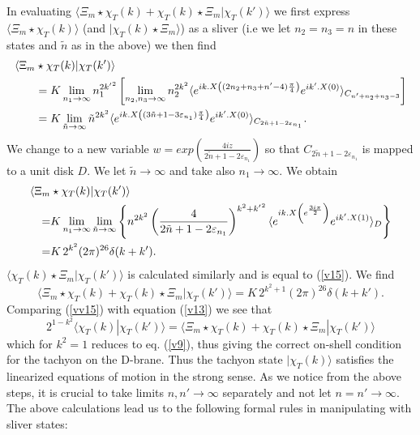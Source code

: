 \documentclass[a4paper,12pt]{article}
\begin{document}
In evaluating $\langle\Xi_m\star\chi_T(k)+
\chi_T(k)\star\Xi_m |\chi_T(k')\rangle$
we first express $\langle\Xi_m\star\chi_T(k)\rangle$ (and
$|\chi_T(k)\star\Xi_m\rangle$) as a sliver (i.e we let $n_2=n_3=n$ in these
states and $\tilde n$ as in the above) we then find
\begin{align}
\langle\Xi_m &\star\chi_T(k)|\chi_T(k')\rangle \notag \\
&=K\lim_{n_1\to\infty}n_1^{2{k'}^2}\left[
\lim_{n_2,n_3\to\infty}n_2^{2k^2}
\langle e^{ik.X\left((2n_2+n_3+n'-4)\frac{\pi}{4}\right)}
e^{ik'.X(0)}\rangle_{C_{n'+n_2+n_3-3}}
\right] \notag \\
&=K\lim_{\tilde n\to\infty}\tilde n^{2k^2}
\langle e^{ik.X\left((3\tilde n+1-3\varepsilon_{n_1})\frac{\pi}{4}\right)}
e^{ik'.X(0)}\rangle_{C_{2\tilde n+1-2\varepsilon_{n_1}}} .
\label{v14}
\end{align}
We change to a new variable
$w=exp(\frac{4iz}{2\tilde n+1-2\varepsilon_{n_1}})$ so that
$C_{2\tilde n+1-2\varepsilon_{n_1}}$ is mapped
to a unit disk $D$. We let $\tilde n\to\infty$  and take also $n_1\to\infty$.
We obtain
\begin{align}
\langle\Xi_m&\star\chi_T(k)|\chi_T(k')\rangle  \notag \\
=& K\lim_{n_1\to\infty}
\lim_{\tilde n\to\infty}\left\{
n^{2k^2}\left(\frac{4}{2\tilde n+1-2\varepsilon_{n_1}}\right)^{k^2+{k'}^2}
\langle e^{ik.X\left(e^{\frac{3i\pi}{2}}\right)}
e^{ik'.X(1)}\rangle_D
\right\} \notag \\
=& K\,2^{k^2}(2\pi)^{26}\delta(k+k') .
\label{v15}
\end{align}
$\langle\chi_T(k)\star\Xi_m|\chi_T(k')\rangle$ is calculated similarly and
is equal to (\ref{v15}). We find
\begin{equation}
\langle\Xi_m\star\chi_T(k)+\chi_T(k)\star\Xi_m|\chi_T(k')\rangle
= K\, 2^{k^2+1}(2\pi)^{26}\delta(k+k').
\label{vv15}
\end{equation}
Comparing (\ref{vv15}) with equation (\ref{v13}) we see that
\begin{equation}
2^{1-k^2}\langle\chi_T(k)|\chi_T(k')\rangle=
\langle\Xi_m\star\chi_T(k)+\chi_T(k)\star\Xi_m
|\chi_T(k')\rangle
\label{v16}
\end{equation}
which for $k^2=1$ reduces to eq. (\ref{v9}), thus giving
the correct on-shell condition for the tachyon on the D-brane.
Thus the tachyon state $|\chi_T(k)\rangle$ satisfies the linearized equations
of motion in the strong sense. As we notice from the above steps, it
is crucial to take limits $n,n'\to\infty$ separately and not let
$n=n'\to\infty$. The above calculations lead us to the following formal rules
in manipulating with sliver states:
\end{document}
